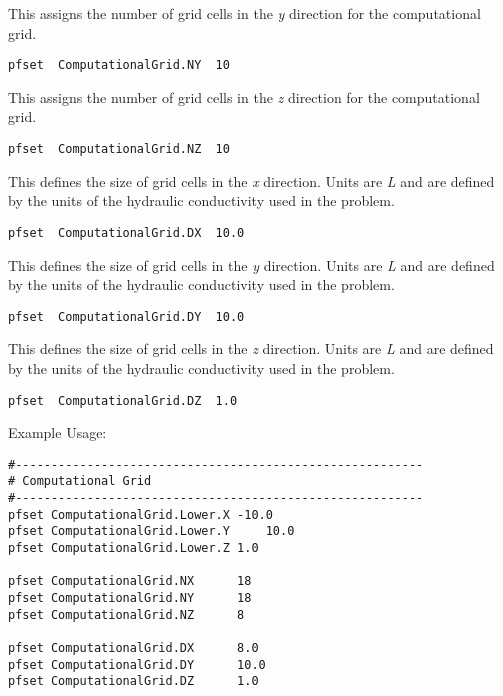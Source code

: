 {This assigns the number of grid cells in the \emph{y} direction for the computational grid.}
\begin{display}\begin{verbatim} 
pfset  ComputationalGrid.NY  10 
\end{verbatim}\end{display} 

{This assigns the number of grid cells in the \emph{z} direction for the computational grid.}
\begin{display}\begin{verbatim} 
pfset  ComputationalGrid.NZ  10 
\end{verbatim}\end{display} 

{This defines the size of grid cells in the \emph{x} direction. Units are \emph{L} and are 
defined by the units of the hydraulic conductivity used in the problem.}
\begin{display}\begin{verbatim} 
pfset  ComputationalGrid.DX  10.0 
\end{verbatim}\end{display} 

{This defines the size of grid cells in the \emph{y} direction. Units are \emph{L} and are 
defined by the units of the hydraulic conductivity used in the problem.}
\begin{display}\begin{verbatim} 
pfset  ComputationalGrid.DY  10.0 
\end{verbatim}\end{display} 

{This defines the size of grid cells in the \emph{z} direction. Units are \emph{L} and are 
defined by the units of the hydraulic conductivity used in the problem.}
\begin{display}\begin{verbatim} 
pfset  ComputationalGrid.DZ  1.0 
\end{verbatim}\end{display} 


Example Usage: \begin{verbatim}
#---------------------------------------------------------
# Computational Grid
#---------------------------------------------------------
pfset ComputationalGrid.Lower.X	-10.0
pfset ComputationalGrid.Lower.Y     10.0
pfset ComputationalGrid.Lower.Z	1.0

pfset ComputationalGrid.NX		18
pfset ComputationalGrid.NY		18
pfset ComputationalGrid.NZ		8

pfset ComputationalGrid.DX		8.0
pfset ComputationalGrid.DY		10.0
pfset ComputationalGrid.DZ		1.0
\end{verbatim}


